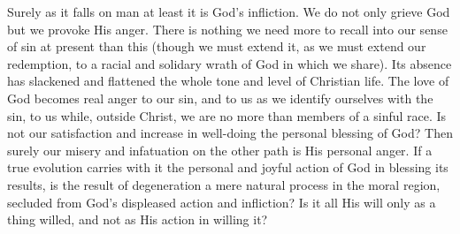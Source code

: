 \documentclass[12pt,letterpaper,oneside]{book}
\begin{document}
Surely as it falls on man at least it is God's infliction. 
We do not only grieve God but we provoke His anger. 
There is nothing we need more to recall into our sense of 
sin at present than this (though we must extend it, as we 
must extend our redemption, to a racial and solidary 
wrath of God in which we share). Its absence has 
slackened and flattened the whole tone and level of 
Christian life. The love of God becomes real anger to 
our sin, and to us as we identify ourselves with the sin, 
to us while, outside Christ, we are no more than members 
of a sinful race. Is not our satisfaction and increase in 
well-doing the personal blessing of God? Then surely our 
misery and infatuation on the other path is His personal 
anger. If a true evolution carries with it the personal 
and joyful action of God in blessing its results, is the 
result of degeneration a mere natural process in the 
moral region, secluded from God's displeased action and 
infliction? Is it all His will only as a thing willed, and 
not as His action in willing it? 
\end{document}
